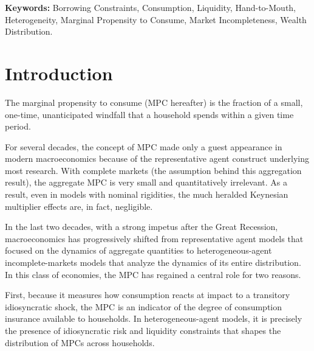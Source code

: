 \bigskip
\bigskip

\noindent \textbf{Keywords:} Borrowing Constraints, Consumption, Liquidity,
Hand-to-Mouth, Heterogeneity, Marginal Propensity to Consume, Market Incompleteness, Wealth
Distribution.\vspace*{1cm}

\noindent {}

\thispagestyle{empty} %
\newpage \addtocounter{page}{-1}

\setlength{\textwidth}{6.93in}


\section{Introduction}
\label{sec:introduction}

The marginal propensity to consume (MPC hereafter) is the fraction of a small, one-time, unanticipated windfall that a household spends within a given time period. 


For several decades, the concept of MPC made only a guest appearance in modern macroeconomics because of the representative agent construct underlying most research. With complete markets (the assumption behind this aggregation result), the aggregate MPC is very small and quantitatively irrelevant. As a result, even in models with nominal rigidities, the much heralded Keynesian multiplier effects are, in fact, negligible. 

In the last two decades, with a strong impetus after the Great Recession, macroeconomics has progressively shifted from representative agent models that focused on the dynamics of aggregate quantities to heterogeneous-agent incomplete-markets models that analyze the dynamics of its entire distribution. In this class of economies, the MPC has regained a central role for two reasons. 

First, because it measures how consumption reacts at impact to a transitory idiosyncratic shock, the MPC is an indicator of the degree of consumption insurance available to households. In heterogeneous-agent models, it is precisely the presence of idiosyncratic risk and liquidity constraints that shapes the distribution of MPCs across households. 

